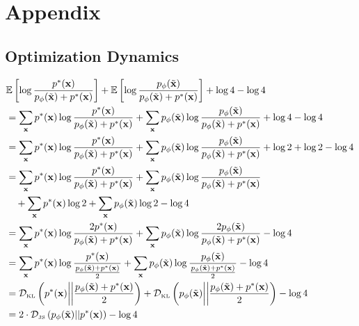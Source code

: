 \section{Appendix}


\subsection{Optimization Dynamics}
\label{sec:proof-for-jsd-thing}
\begin{small}
  \begin{align}
    & \mathbb{E}\left[\log{{\pt \over \pg + \pt}}\right] + \mathbb{E}\left[\log{\pg\over\pg + \pt}\right] + \log4 - \log4 \\
    & = \sum_{\*x}\pt\log{\pt \over \pg + \pt} + \sum_{\*x}\pg\log{\pg \over \pg + \pt} + \log4 - \log4 \\
    & = \sum_{\*x}\pt\log{\pt \over \pg + \pt} + \sum_{\*x}\pg\log{\pg \over \pg + \pt} + \log2 + \log2 - \log4 \\
    & = \sum_{\*x}\pt\log{\pt \over \pg + \pt} + \sum_{\*x}\pg\log{\pg
      \over \pg + \pt} \\
    & \quad + \sum_{\*x}\pt\log2 + \sum_{\*x}\pg\log2 - \log4 \\
    & = \sum_{\*x}\pt\log{2\pt \over \pg + \pt} + \sum_{\*x}\pg\log{2\pg \over \pg + \pt} - \log4 \\
    & = \sum_{\*x}\pt\log{\pt \over {\pg + \pt \over 2}} + \sum_{\*x}\pg\log{\pg \over {\pg + \pt \over 2}} - \log4 \\
    & = \KL{\pt}{\pg + \pt \over 2} + \KL{\pg}{\pg+\pt \over 2} - \log4 \\
    & = 2 \cdot \JSD{\pg}{\pt} - \log4
  \end{align}
\end{small}

